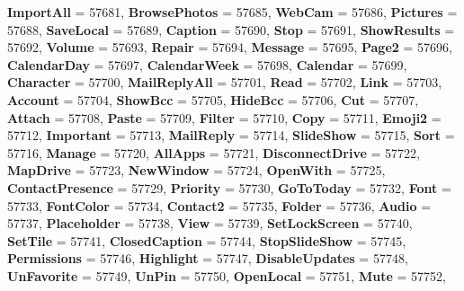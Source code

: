 \begin{DoxyCompactItemize}
{\bfseries Import\+All} = 57681, 
{\bfseries Browse\+Photos} = 57685, 
{\bfseries Web\+Cam} = 57686, 
\newline
{\bfseries Pictures} = 57688, 
{\bfseries Save\+Local} = 57689, 
{\bfseries Caption} = 57690, 
{\bfseries Stop} = 57691, 
\newline
{\bfseries Show\+Results} = 57692, 
{\bfseries Volume} = 57693, 
{\bfseries Repair} = 57694, 
{\bfseries Message} = 57695, 
\newline
{\bfseries Page2} = 57696, 
{\bfseries Calendar\+Day} = 57697, 
{\bfseries Calendar\+Week} = 57698, 
{\bfseries Calendar} = 57699, 
\newline
{\bfseries Character} = 57700, 
{\bfseries Mail\+Reply\+All} = 57701, 
{\bfseries Read} = 57702, 
{\bfseries Link} = 57703, 
\newline
{\bfseries Account} = 57704, 
{\bfseries Show\+Bcc} = 57705, 
{\bfseries Hide\+Bcc} = 57706, 
{\bfseries Cut} = 57707, 
\newline
{\bfseries Attach} = 57708, 
{\bfseries Paste} = 57709, 
{\bfseries Filter} = 57710, 
{\bfseries Copy} = 57711, 
\newline
{\bfseries Emoji2} = 57712, 
{\bfseries Important} = 57713, 
{\bfseries Mail\+Reply} = 57714, 
{\bfseries Slide\+Show} = 57715, 
\newline
{\bfseries Sort} = 57716, 
{\bfseries Manage} = 57720, 
{\bfseries All\+Apps} = 57721, 
{\bfseries Disconnect\+Drive} = 57722, 
\newline
{\bfseries Map\+Drive} = 57723, 
{\bfseries New\+Window} = 57724, 
{\bfseries Open\+With} = 57725, 
{\bfseries Contact\+Presence} = 57729, 
\newline
{\bfseries Priority} = 57730, 
{\bfseries Go\+To\+Today} = 57732, 
{\bfseries Font} = 57733, 
{\bfseries Font\+Color} = 57734, 
\newline
{\bfseries Contact2} = 57735, 
{\bfseries Folder} = 57736, 
{\bfseries Audio} = 57737, 
{\bfseries Placeholder} = 57738, 
\newline
{\bfseries View} = 57739, 
{\bfseries Set\+Lock\+Screen} = 57740, 
{\bfseries Set\+Tile} = 57741, 
{\bfseries Closed\+Caption} = 57744, 
\newline
{\bfseries Stop\+Slide\+Show} = 57745, 
{\bfseries Permissions} = 57746, 
{\bfseries Highlight} = 57747, 
{\bfseries Disable\+Updates} = 57748, 
\newline
{\bfseries Un\+Favorite} = 57749, 
{\bfseries Un\+Pin} = 57750, 
{\bfseries Open\+Local} = 57751, 
{\bfseries Mute} = 57752, 
\newline

\end{DoxyCompactItemize}
